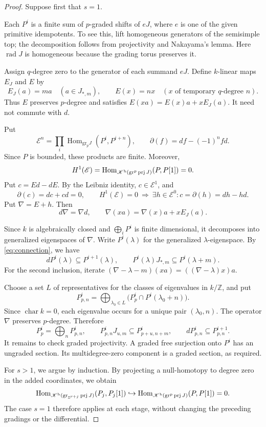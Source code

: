 \documentclass[12pt,a4paper,english,reqno]{amsart}
\theoremstyle{plain}
\theoremstyle{definition}
\numberwithin{equation}{section}
\def\la{\lambda}
\def\Hom{\operatorname{Hom}}
\def\rad{\operatorname{rad}}
\def\prj{\operatorname{prj}}
\def\Kb{{\mathcal K}^{\text{\rm b}}}
\def\bbZ{{\mathbb Z}}
\def\incl{\hookrightarrow}
\def\Ds{\bigoplus}
\def\gr{\operatorname{gr}}
\begin{document}
\begin{proof}
Suppose first that $s=1$.

Each $P^i$ is a finite sum of $p$-graded shifts of $eJ$, where $e$ is one of the given primitive idempotents. To see this, lift homogeneous generators of the semisimple top; the decomposition follows from projectivity and Nakayama's lemma. Here $\rad J$ is homogeneous because the grading torus preserves it.

Assign $q$-degree zero to the generator of each summand $eJ$. Define $k$-linear maps $E_J$ and $E$ by
\[
 E_J(a)=ma\quad(a\in J_{*,m}),\qquad
 E(x)=nx\quad(x\text{ of temporary }q\text{-degree }n).
\]
Thus $E$ preserves $p$-degree and satisfies $E(xa)=E(x)a+xE_J(a)$. It need not commute with $d$.

Put
\[
 \mathcal E^n=\prod_i\Hom_{\mathrm{gr}_pJ}(P^i,P^{i+n}),\qquad
 \partial(f)=df-(-1)^nfd.
\]
Since $P$ is bounded, these products are finite. Moreover,
\[
 H^1(\mathcal E)=\Hom_{\Kb(\gr^p\prj J)}(P,P[1])=0.
\]
Put $c=Ed-dE$. By the Leibniz identity, $c\in\mathcal E^1$, and
\[
 \partial(c)=dc+cd=0,\qquad
 H^1(\mathcal E)=0
 \ \Longrightarrow\ \exists h\in\mathcal E^0:
 c=\partial(h)=dh-hd.
\]
Put $\nabla=E+h$. Then
\begin{equation}\label{eq:connection}
 d\nabla=\nabla d,\qquad
 \nabla(xa)=\nabla(x)a+xE_J(a).
\end{equation}

Since $k$ is algebraically closed and $\Ds_iP^i$ is finite dimensional, it decomposes into generalized eigenspaces of $\nabla$. Write $P^i(\la)$ for the generalized $\la$-eigenspace. By \eqref{eq:connection}, we have
\[
 dP^i(\la)\subseteq P^{i+1}(\la),\qquad
 P^i(\la)J_{*,m}\subseteq P^i(\la+m).
\]
For the second inclusion, iterate
$(\nabla-\la-m)(xa)=((\nabla-\la)x)a$.

Choose a set $L$ of representatives for the classes of eigenvalues
in $k/\bbZ$, and put
\[
 P^i_{p,n}=\bigoplus_{\la_0\in L}
       \bigl(P^i_p\cap P^i(\la_0+n)\bigr).
\]
Since $\operatorname{char}k=0$, each eigenvalue occurs for a unique pair
$(\la_0,n)$. The operator $\nabla$ preserves $p$-degree. Therefore
\[
 P^i_p=\Ds_nP^i_{p,n},\qquad
 P^i_{p,n}J_{u,m}\subseteq P^i_{p+u,n+m},\qquad
 dP^i_{p,n}\subseteq P^{i+1}_{p,n}.
\]
It remains to check graded projectivity. A graded free surjection onto $P^i$ has an ungraded section. Its multidegree-zero component is a graded section, as required.

For $s>1$, we argue by induction. By projecting a null-homotopy to degree zero in the added coordinates, we obtain
\[
 \Hom_{\Kb(\gr_{\bbZ^{r+j}}\prj J)}(P_j,P_j[1])
 \incl
 \Hom_{\Kb(\gr^p\prj J)}(P,P[1])=0.
\]
The case $s=1$ therefore applies at each stage, without changing the preceding gradings or the differential.
\end{proof}
\end{document}
